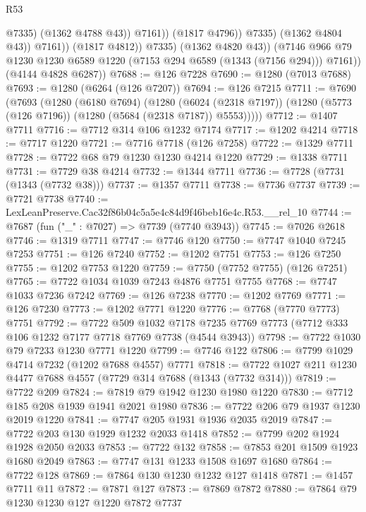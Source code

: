 \begin{lexlean}{R53}
\begin{coremodule}
                                @7335)
                              (@1362 @4788 @43))
                            @7161))
                        (@1817 @4796))
                      @7335)
                    (@1362 @4804 @43))
                  @7161))
              (@1817 @4812))
            @7335)
          (@1362 @4820 @43))
        (@7146 @966 @79 @1230 @1230 @6589 @1220 (@7153 @294 @6589 (@1343 (@7156 @294))) @7161))
      (@4144 @4828 @6287))
@7688 := @126 @7228
@7690 := @1280 (@7013 @7688)
@7693 := @1280 (@6264 (@126 @7207))
@7694 := @126 @7215
@7711 := @7690
    (@7693
      (@1280
        (@6180 @7694)
        (@1280
          (@6024 (@2318 @7197))
          (@1280 (@5773 (@126 @7196)) (@1280 (@5684 (@2318 @7187)) @5553)))))
@7712 := @1407 @7711
@7716 := @7712 @314 @106 @1232 @7174
@7717 := @1202 @4214
@7718 := @7717 @1220
@7721 := @7716 @7718 (@126 @7258)
@7722 := @1329 @7711
@7728 := @7722 @68 @79 @1230 @1230 @4214 @1220
@7729 := @1338 @7711
@7731 := @7729 @38 @4214
@7732 := @1344 @7711
@7736 := @7728 (@7731 (@1343 (@7732 @38)))
@7737 := @1357 @7711
@7738 := @7736 @7737
@7739 := @7721 @7738
@7740 := LexLeanPreserve.Cac32f86b04c5a5e4c84d9f46beb16e4c.R53.__rel_10
@7744 := @7687 (fun ("_" : @7027) => @7739 (@7740 @3943))
@7745 := @7026 @2618
@7746 := @1319 @7711
@7747 := @7746 @120
@7750 := @7747 @1040 @7245 @7253
@7751 := @126 @7240
@7752 := @1202 @7751
@7753 := @126 @7250
@7755 := @1202 @7753 @1220
@7759 := @7750 (@7752 @7755) (@126 @7251)
@7765 := @7722 @1034 @1039 @7243 @4876 @7751 @7755
@7768 := @7747 @1033 @7236 @7242
@7769 := @126 @7238
@7770 := @1202 @7769
@7771 := @126 @7230
@7773 := @1202 @7771 @1220
@7776 := @7768 (@7770 @7773) @7751
@7792 := @7722
    @509
    @1032
    @7178
    @7235
    @7769
    @7773
    (@7712 @333 @106 @1232 @7177 @7718 @7769 @7738 (@4544 @3943))
@7798 := @7722 @1030 @79 @7233 @1230 @7771 @1220
@7799 := @7746 @122
@7806 := @7799 @1029 @4714 @7232 (@1202 @7688 @4557) @7771
@7818 := @7722 @1027 @211 @1230 @4477 @7688 @4557 (@7729 @314 @7688 (@1343 (@7732 @314)))
@7819 := @7722 @209
@7824 := @7819 @79 @1942 @1230 @1980 @1220
@7830 := @7712 @185 @208 @1939 @1941 @2021 @1980
@7836 := @7722 @206 @79 @1937 @1230 @2019 @1220
@7841 := @7747 @205 @1931 @1936 @2035 @2019
@7847 := @7722 @203 @130 @1929 @1232 @2033 @1418
@7852 := @7799 @202 @1924 @1928 @2050 @2033
@7853 := @7722 @132
@7858 := @7853 @201 @1509 @1923 @1680 @2049
@7863 := @7747 @131 @1233 @1508 @1697 @1680
@7864 := @7722 @128
@7869 := @7864 @130 @1230 @1232 @127 @1418
@7871 := @1457 @7711 @11
@7872 := @7871 @127
@7873 := @7869 @7872
@7880 := @7864 @79 @1230 @1230 @127 @1220 @7872 @7737

\end{coremodule}
\end{lexlean}
